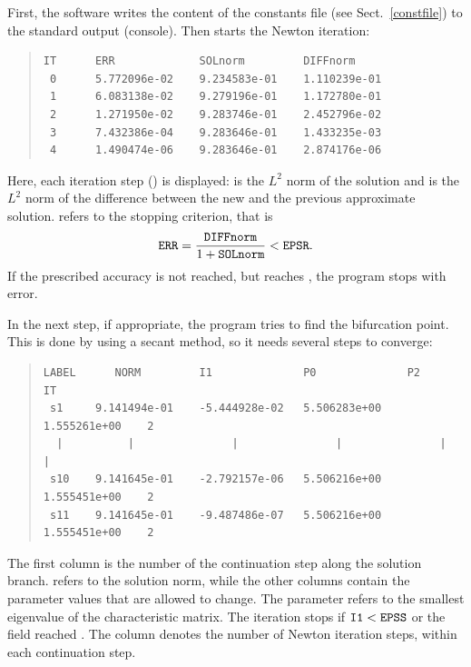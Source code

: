 \documentclass[10pt,a4paper]{ddedoc}
\begin{document}
First, the software writes the content of the constants file (see Sect.\ \ref{constfile}) to the standard output (console). Then starts the Newton iteration:
{ \small \begin{quote} \begin{lstlisting}[basicstyle=\tt,frame=single]
IT      ERR             SOLnorm         DIFFnorm
 0      5.772096e-02    9.234583e-01    1.110239e-01
 1      6.083138e-02    9.279196e-01    1.172780e-01
 2      1.271950e-02    9.283746e-01    2.452796e-02
 3      7.432386e-04    9.283646e-01    1.433235e-03
 4      1.490474e-06    9.283646e-01    2.874176e-06
\end{lstlisting} \end{quote} } \noindent
Here, each iteration step () is displayed:  is the $L^2$ norm of the solution and  is the $L^2$ norm of the difference between the new and the previous approximate solution.  refers to the stopping criterion, that is
\[
	{\tt ERR} = \frac{{\tt DIFFnorm}}{1+{\tt SOLnorm}} < {\tt EPSR}.
\]
If the prescribed accuracy is not reached, but  reaches , the program stops with error.

In the next step, if appropriate, the program tries to find the bifurcation point. This is done by using a secant method, so it needs several steps to converge:
{ \small \begin{quote} \begin{lstlisting}[basicstyle=\tt,frame=single]
LABEL      NORM         I1              P0              P2              IT
 s1     9.141494e-01    -5.444928e-02   5.506283e+00    1.555261e+00    2
  |          |               |               |               |          |
 s10    9.141645e-01    -2.792157e-06   5.506216e+00    1.555451e+00    2
 s11    9.141645e-01    -9.487486e-07   5.506216e+00    1.555451e+00    2
\end{lstlisting} \end{quote} } \noindent
The first column is the number of the continuation step along the solution branch.  refers to the solution norm, while the other columns contain the parameter values that are allowed to change. The parameter  refers to the smallest eigenvalue of the characteristic matrix. The iteration stops if ${\tt I1} < {\tt EPSS}$ or the  field reached . The  column denotes the number of Newton iteration steps, within each continuation step.
\end{document}
